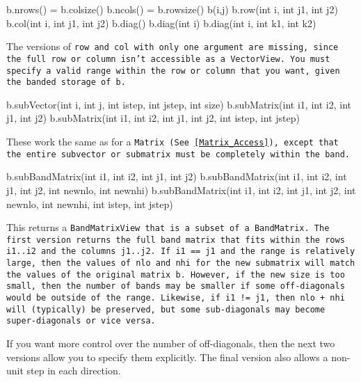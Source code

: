 \begin{tmvcode}
b.nrows() = b.colsize()
b.ncols() = b.rowsize()
b(i,j)
b.row(int i, int j1, int j2)
b.col(int i, int j1, int j2)
b.diag()
b.diag(int i)
b.diag(int i, int k1, int k2)
\end{tmvcode}
The versions of \tt{row} and \tt{col} with only one argument are
missing, since the full row or column isn't accessible as a \tt{VectorView}.
You must specify a valid range within the row or column that you want, 
given the banded storage of \tt{b}.

\begin{tmvcode}
b.subVector(int i, int j, int istep, int jstep, int size)
b.subMatrix(int i1, int i2, int j1, int j2)
b.subMatrix(int i1, int i2, int j1, int j2, int istep, int jstep)
\end{tmvcode}
These work the same as for a \tt{Matrix}
(See \ref{Matrix_Access}),
except that the entire
subvector or submatrix must be completely within the band.

\begin{tmvcode}
b.subBandMatrix(int i1, int i2, int j1, int j2)
b.subBandMatrix(int i1, int i2, int j1, int j2, int newnlo, int newnhi)
b.subBandMatrix(int i1, int i2, int j1, int j2, int newnlo, int newnhi, 
      int istep, int jstep)
\end{tmvcode}
This returns a \tt{BandMatrixView} that is a subset of a \tt{BandMatrix}.
The first version returns the full band matrix that fits within the rows
\tt{i1..i2} and the columns \tt{j1..j2}.  If \tt{i1 == j1} and the range is 
relatively large, then the values of \tt{nlo} and \tt{nhi} for the new 
submatrix will match the values of the original matrix \tt{b}.  However,
if the new size is too small, then the number of bands may be 
smaller if some off-diagonals would be outside of the range. 
Likewise, if \tt{i1 != j1}, then \tt{nlo + nhi} will (typically) be preserved, but some 
sub-diagonals may become super-diagonals or vice versa.

If you want more control over the number of off-diagonals, then
the next two versions allow you to specify them explicitly.  The final
version also allows a non-unit step in each direction.

